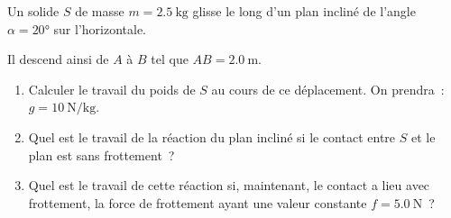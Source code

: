 Un solide $S$ de masse $m=\qty{2.5}{\kg}$ glisse le long d'un plan incliné de
l'angle $\alpha=\ang{20}$ sur l'horizontale.

Il descend ainsi de $A$ à $B$ tel que $A B=\qty{2.0}{\m}$.

\begin{figure}[H]
    \centering
\end{figure}

\begin{enumerate}
    \item Calculer le travail du poids de $S$ au cours de ce déplacement. On
          prendra~: $g=\qty{10}{\N\per\kg}$.
    \item Quel est le travail de la réaction du plan incliné si le contact entre
          $S$ et le plan est sans frottement~?
    \item Quel est le travail de cette réaction si, maintenant, le contact a
          lieu avec frottement, la force de frottement ayant une valeur
          constante $f=\qty{5.0}{\N}$~?
\end{enumerate}
